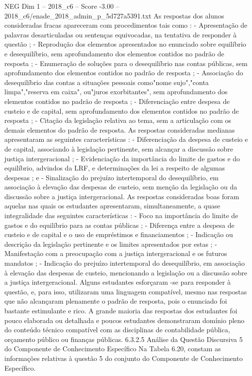\begin{textsample}{NEG Dim 1 – 2018\_c6 – Score -3.00 – 2018\_c6/enade\_2018\_admin\_p\_5d727a5391.txt}
As respostas dos alunos consideradas fracas apareceram com procedimentos tais como : - Apresentação de palavras desarticuladas ou sentenças equivocadas, na tentativa de responder à questão ; - Reprodução dos elementos apresentados no enunciado sobre equilíbrio e desequilíbrio, sem aprofundamento dos elementos contidos no padrão de resposta ; - Enumeração de soluções para o desequilíbrio nas contas públicas, sem aprofundamento dos elementos contidos no padrão de resposta ; - Associação do desequilíbrio das contas a situações pessoais como"nome sujo","conta limpa","reserva em caixa", ou"juros exorbitantes", sem aprofundamento dos elementos contidos no padrão de resposta ; - Diferenciação entre despesa de custeio e de capital, sem aprofundamento dos elementos contidos no padrão de resposta ; - Citação da legislação relativa ao tema, sem a articulação com os demais elementos do padrão de resposta.
As respostas consideradas medianas apresentaram as seguintes características : - Diferenciação da despesa de custeio e de capital, associando à legislação pertinente, sem alcançar a discussão sobre justiça intergeracional ; - Evidenciação da importância do limite de gastos e do equilíbrio, advindos da LRF, e determinações da lei a respeito de algumas despesas ; e - Sinalização do prejuízo intertemporal do desequilíbrio, em associação à elevação das despesas de custeio, sem menção da legislação ou da discussão sobre a justiça intergeracional.
As respostas consideradas boas foram aquelas nas quais os estudantes apresentaram, simultaneamente, a quase integralidade das seguintes características : - Foco na importância do limite de gastos e do equilíbrio para as contas públicas ; - Diferença entre a despesa de custeio e de capital e o uso de empréstimos e financiamentos ; - Indicação ou descrição da legislação pertinente e os limites apresentados por estas ; - Manifestação com a preocupação com a justiça intergeracional e os futuros mandatos ; - Indicação do prejuízo intertemporal do desequilíbrio, em associação à elevação das despesas de custeio, mencionando a legislação ou a discussão sobre a justiça intergeracional.
Alguns estudantes esforçaram -se para responder à questão, e, para isso, utilizaram uma linguagem compatível, mesmo nas respostas que não alcançaram plenamente o padrão de resposta, pois o enunciado foi bastante estimulante e rico.
A grande maioria das respostas dos estudantes foi pouco elaborada ou detalhada e poucos estudantes demonstraram domínio pleno do conteúdo técnico compatível com as disciplinas de contabilidade pública, orçamento público ou finanças públicas. 6.3.2.5 Análise da Questão Discursiva 5 do Componente de Conhecimento Específico Na Tabela 6.20, constam as informações relativas à questão 5 do conjunto do Componente de Conhecimento Específico.

\end{textsample}
